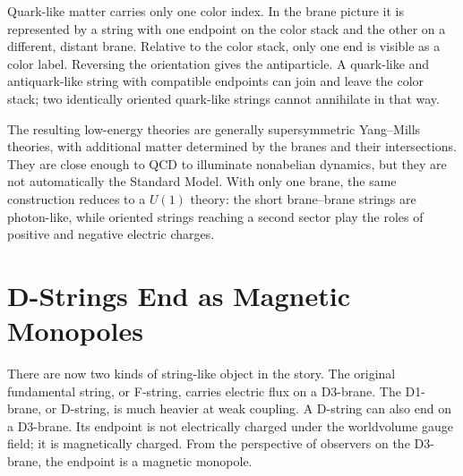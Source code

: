 
Quark-like matter carries only one color index.  In the brane picture it is
represented by a string with one endpoint on the color stack and the other
on a different, distant brane.  Relative to the color stack, only one end
is visible as a color label.  Reversing the orientation gives the
antiparticle.  A quark-like and antiquark-like string with compatible
endpoints can join and leave the color stack; two identically oriented
quark-like strings cannot annihilate in that way.

The resulting low-energy theories are generally supersymmetric Yang--Mills
theories, with additional matter determined by the branes and their
intersections.  They are close enough to QCD to illuminate nonabelian
dynamics, but they are not automatically the Standard Model.  With only one
brane, the same construction reduces to a \(U(1)\) theory: the short
brane--brane strings are photon-like, while oriented strings reaching a
second sector play the roles of positive and negative electric charges.

\section{D-Strings End as Magnetic Monopoles}

There are now two kinds of string-like object in the story.  The original
fundamental string, or F-string, carries electric flux on a D3-brane.  The
D1-brane, or D-string, is much heavier at weak coupling.  A D-string can also
end on a D3-brane.  Its endpoint is not electrically charged under the
worldvolume gauge field; it is magnetically charged.  From the perspective
of observers on the D3-brane, the endpoint is a magnetic monopole.

